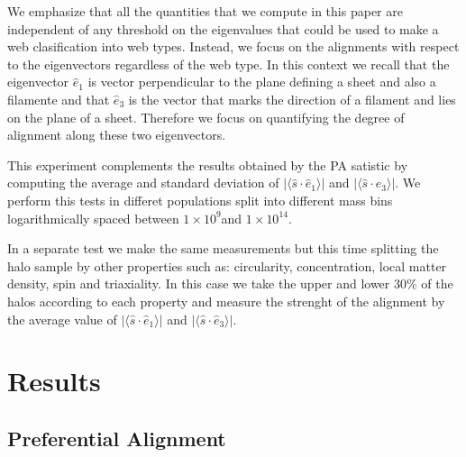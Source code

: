 \documentclass[useAMS,usenatbib]{mn2e}
\newcommand{\hMsun}{{\ifmmode{h^{-1}{\rm
        {M_{\odot}}}}\else{$h^{-1}{\rm{M_{\odot}}}$~}\fi}}
\begin{document}
We emphasize that all the quantities that we compute in this paper are
independent of any threshold on the eigenvalues that could be used to make a web
clasification into web types. Instead, we focus on the alignments with
respect to the eigenvectors regardless of the web type. In this
context we recall that the eigenvector $\hat{e}_1$ is vector
perpendicular to the plane defining a sheet and also a filamente and
that $\hat{e}_3$ is the vector that marks the direction of a filament
and lies on the plane of a sheet. Therefore we focus on quantifying
the degree of alignment along these two eigenvectors. 

This experiment complements the results obtained by the PA satistic by
computing the average and standard deviation of
$\vert\langle\hat{s}\cdot\hat{e}_1\rangle\vert$ and
$\vert\langle\hat{s}\cdot\hat{e}_3\rangle\vert$.  We perform this
tests in differet populations split into different mass bins
logarithmically spaced between $1\times 10^{9}$\hMsun and
$1\times10^{14}$\hMsun.  

In a separate test we make the same measurements but this time
splitting the halo sample by other properties such as:
circularity, concentration, local matter density, spin and
triaxiality. In this case we take the upper and lower $30\%$ of the
halos according to each property and measure the strenght of the
alignment by the average value of
$\vert\langle\hat{s}\cdot\hat{e}_1\rangle\vert$ and
$\vert\langle\hat{s}\cdot\hat{e}_3\rangle\vert$. 

\section{Results}
\label{sec:results}


\subsection{Preferential Alignment}
\end{document}
